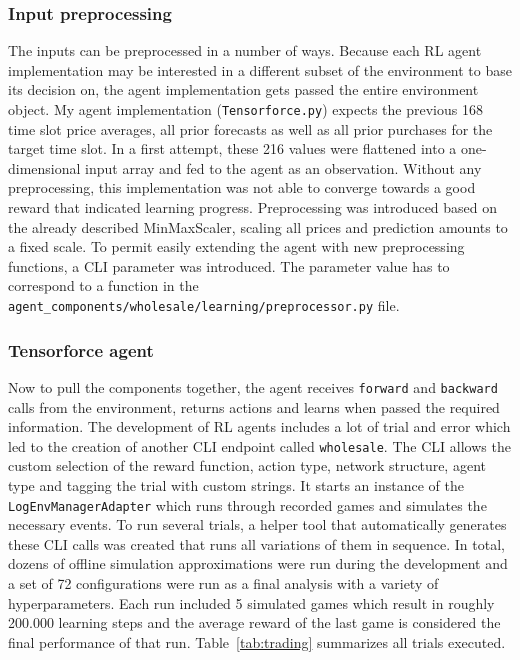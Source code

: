 \subsubsection{Input preprocessing}%
\label{sub:input_preprocessing}

The inputs can be preprocessed in a number of ways. Because each \ac{RL} agent implementation may be interested in a
different subset of the environment to base its decision on, the agent implementation gets passed the entire environment
object. 
My agent implementation (\texttt{Tensorforce.py})
expects the previous 168 time slot price averages, all prior forecasts as well as all prior purchases for the
target time slot. In a first attempt, these 216 values were flattened into a one-dimensional input array and fed
to the agent as an observation. Without any preprocessing, this implementation was not able to converge towards a good
reward that indicated learning progress. Preprocessing was introduced based on the already described MinMaxScaler,
scaling all prices and prediction amounts to a fixed scale. To permit easily extending the agent with new preprocessing
functions, a CLI parameter was introduced. The parameter value has to correspond to a function in the
\texttt{agent\_components/wholesale/learning/preprocessor.py} file. 

\subsubsection{Tensorforce agent}%
\label{sub:tensorforce_agent}

Now to pull the components together, the agent receives \texttt{forward} and \texttt{backward} calls from
the environment, returns actions and learns when passed the required information. The development of \ac{RL} agents
includes a lot of trial and error which led to the creation of another \ac{CLI} endpoint called \texttt{wholesale}. The
\ac{CLI} allows the custom selection of the reward function, action type, network structure, agent type and tagging the
trial with custom strings. It starts an instance of the \texttt{LogEnvManagerAdapter} which runs through recorded
games and simulates the necessary events. To run several trials, a helper tool that automatically generates
these CLI calls was created that runs all variations of them in sequence. In total, dozens of offline simulation approximations were
run during the development and a set of 72 configurations were run as a final analysis with a variety of
hyperparameters. Each run included 5 simulated games which result in roughly 200.000 learning steps and the average
reward of the last game is considered the final performance of that run. Table~\ref{tab:trading} summarizes all trials
executed. 

